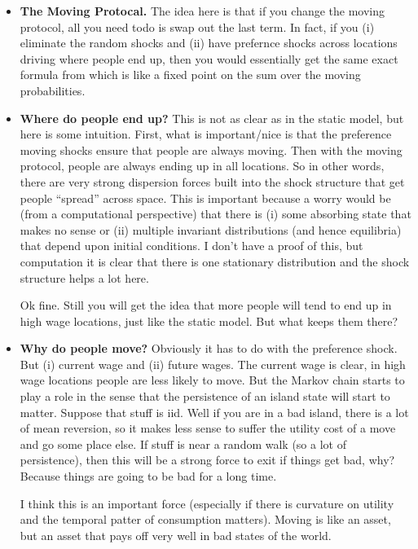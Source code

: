 \documentclass[pdftex,12pt]{article}
\begin{document}
\begin{itemize}
\item \textbf{The Moving Protocal.} The idea here is that if you change the moving protocol, all you need todo is swap out the last term. In fact, if you (i) eliminate the random shocks and (ii) have prefernce shocks across locations driving where people end up, then you would essentially get the same exact formula from \citet{caliendo2015trade} which is like a fixed point on the sum over the moving probabilities. 
    
\item \textbf{Where do people end up?} This is not as clear as in the static model, but here is some intuition. First, what is important/nice is that the preference moving shocks ensure that people are always moving. Then with the moving protocol, people are always ending up in all locations. So in other words, there are very strong dispersion forces built into the shock structure that get people ``spread'' across space. This is important because a worry would be (from a computational perspective) that there is (i) some absorbing state that makes no sense or (ii) multiple invariant distributions (and hence equilibria) that depend upon initial conditions. I don't have a proof of this, but computation it is clear that there is one stationary distribution and the shock structure helps a lot here. 
    
    Ok fine. Still you will get the idea that more people will tend to end up in high wage locations, just like the static model. But what keeps them there?
    
\item \textbf{Why do people move?} Obviously it has to do with the preference shock. But (i) current wage and (ii) future wages. The current wage is clear, in high wage locations people are less likely to move. But the Markov chain starts to play a role in the sense that the persistence of an island state will start to matter. Suppose that stuff is iid. Well if you are in a bad island, there is a lot of mean reversion, so it makes less sense to suffer the utility cost of a move and go some place else. If stuff is near a random walk (so a lot of persistence), then this will be a strong force to exit if things get bad, why? Because things are going to be bad for a long time.
    
    I think this is an important force (especially if there is curvature on utility and the temporal patter of consumption matters). Moving is like an asset, but an asset that pays off very well in bad states of the world.  
    

\end{itemize}
\end{document}
